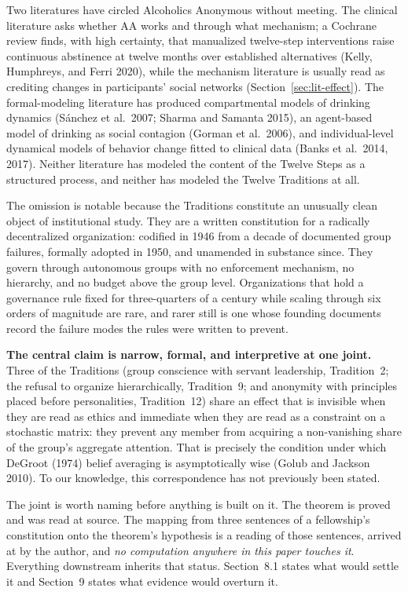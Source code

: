 \documentclass[11pt,a4paper]{article}
\begin{document}
Two literatures have circled Alcoholics Anonymous without meeting. The clinical
literature asks whether AA works and through what mechanism; a Cochrane review
finds, with high certainty, that manualized twelve-step interventions raise
continuous abstinence at twelve months over established alternatives (Kelly,
Humphreys, and Ferri 2020), while the mechanism literature is usually read as crediting changes
in participants' social networks (Section~\ref{sec:lit-effect}). The formal-modeling literature
has produced compartmental models of drinking dynamics (S\'anchez et al.\ 2007;
Sharma and Samanta 2015), an agent-based model of drinking as social contagion
(Gorman et al.\ 2006), and individual-level dynamical models of behavior change fitted to
clinical data (Banks et al.\ 2014, 2017). Neither literature has modeled the
content of the Twelve Steps as a structured process, and neither has modeled the
Twelve Traditions at all.

The omission is notable because the Traditions constitute an unusually clean
object of institutional study. They are a written constitution for a radically
decentralized organization: codified in 1946 from a decade of documented group
failures, formally adopted in 1950, and unamended in substance since. They govern
through autonomous groups with no enforcement mechanism, no
hierarchy, and no budget above the group level. Organizations that hold a
governance rule fixed for three-quarters of a century while scaling through six
orders of magnitude are rare, and rarer still is one whose founding documents
record the failure modes the rules were written to prevent.

\textbf{The central claim is narrow, formal, and interpretive at one joint.}
Three of the Traditions (group conscience with servant leadership, Tradition~2;
the refusal to organize hierarchically, Tradition~9; and anonymity with principles
placed before personalities, Tradition~12) share an effect that is invisible when
they are read as ethics and immediate when they are read as a constraint on a
stochastic matrix: they prevent any member from acquiring a non-vanishing share of
the group's aggregate attention. That is precisely the condition under which
DeGroot (1974) belief averaging is asymptotically wise (Golub and Jackson 2010).
To our knowledge, this correspondence has not previously been stated.

The joint is worth naming before anything is built on it. The theorem is proved
and was read at source. The mapping from three sentences of a fellowship's
constitution onto the theorem's hypothesis is a reading of those sentences,
arrived at by the author, and \emph{no computation anywhere in this paper touches
it}. Everything downstream inherits that status. Section~8.1 states what would
settle it and Section~9 states what evidence would overturn it.
\end{document}
